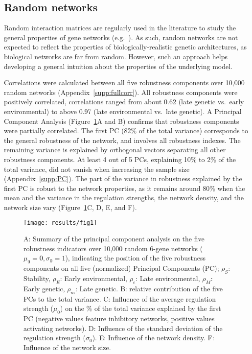 \documentclass[10pt,a4paper]{article}
\newcommand{\stability}{{\rho_S}}
\newcommand{\earlyenv}{{\rho_E}}
\newcommand{\lateenv}{{\rho_e}}
\newcommand{\earlymut}{{\rho_M}}
\newcommand{\latemut}{{\rho_m}}
\newcommand{\SupMat}{Appendix~}
\begin{document}
\subsection{Random networks}

Random interaction matrices are regularly used in the literature to study the general properties of gene networks (e.g.\ \cite{CTH11,PBF12}). As such, random networks are not expected to reflect the properties of biologically-realistic genetic architectures, as biological networks are far from random. However, such an approach helps developing a general intuition about the properties of the underlying model. 

Correlations were calculated between all five robustness components over 10,000 random networks (\SupMat \ref{supp:fullcorr}). All robustness components were positively correlated, correlations ranged from about 0.62 (late genetic vs.\ early environmental) to above 0.97 (late environmental vs.\ late genetic). A Principal Component Analysis (Figure~\ref{fig:pca}A and B) confirms that robustness components were partially correlated. The first PC (82\% of the total variance) corresponds to the general robustness of the network, and involves all robustness indexes. The remaining variance is explained by orthogonal vectors separating all other robustness components. At least 4 out of 5 PCs, explaining 10\% to 2\% of the total variance, did not vanish when increasing the sample size (\SupMat \ref{supp:PC}). The part of the variance in robustness explained by the first PC is robust to the network properties, as it remains around 80\%  when the mean and the variance in the regulation strengths, the network density, and the network size vary (Figure~\ref{fig:pca}C, D, E, and F). 

\begin{figure}[t]
\begin{adjustwidth}{-1.5in}{0in}
\texttt{[image: results/fig1]}
\caption{\color{Gray} \label{fig:pca} A: Summary of the principal component analysis on the five robustness indicators over 10,000 random 6-gene networks ($\mu_0=0, \sigma_0=1$), indicating the position of the five robustness components on all five (normalized) Principal Components (PC); $\stability$: Stability, $\earlyenv$: Early environmental, $\lateenv$: Late environmental, $\earlymut$: Early genetic, $\latemut$: Late genetic. B: relative contribution of the five PCs to the total variance. C: Influence of the average regulation strength ($\mu_0$) on the \% of the total variance explained by the first PC (negative values feature inhibitory networks, positive values activating networks). D: Influence of the standard deviation of the regulation strength ($\sigma_0$). E: Influence of the network density. F: Influence of the network size. }
\end{adjustwidth}
\end{figure}
\end{document}
